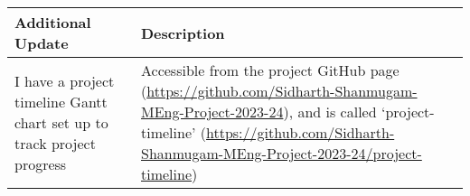 \begin{table}[!h]
    \centering
    \begin{tabularx}{\textwidth}{|X|X|}
        \hline
        Additional Update & Description \\
        \hline
        \hline
        I have a project timeline Gantt chart set up to track project progress & 
        Accessible from the project GitHub page (\url{https://github.com/Sidharth-Shanmugam-MEng-Project-2023-24}), and is called `project-timeline' (\url{https://github.com/Sidharth-Shanmugam-MEng-Project-2023-24/project-timeline}) \\
        \hline
    \end{tabularx}
\end{table}
